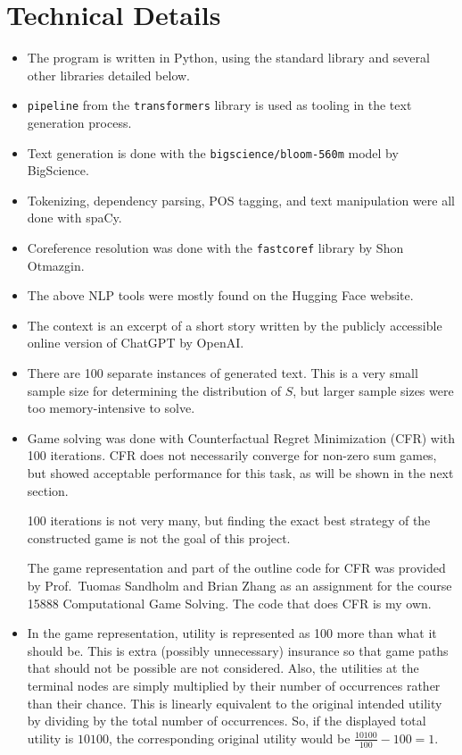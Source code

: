 \documentclass[11pt]{article}
\begin{document}
    \section{Technical Details}\label{sec:technical-details}

    \begin{itemize}
        \item
        The program is written in Python, using the standard library and several other libraries detailed below.
        \item
        \texttt{pipeline} from the \texttt{transformers} library is used as tooling in the text generation process.
        \item
        Text generation is done with the \texttt{bigscience/bloom-560m} model by BigScience.
        \item
        Tokenizing, dependency parsing, POS tagging, and text manipulation were all done with spaCy.
        \item
        Coreference resolution was done with the \texttt{fastcoref} library by Shon Otmazgin.
        \item
        The above NLP tools were mostly found on the Hugging Face website.
        \item
        The context is an excerpt of a short story written by the publicly accessible online version of ChatGPT
        by OpenAI\@.
        \item
        There are 100 separate instances of generated text.
        This is a very small sample size for determining the distribution of $S$,
        but larger sample sizes were too memory-intensive to solve.
        \item
        Game solving was done with Counterfactual Regret Minimization (CFR) with 100 iterations.
        CFR does not necessarily converge for non-zero sum games,
        but showed acceptable performance for this task, as will be shown in the next section.

        100 iterations is not very many,
        but finding the exact best strategy of the constructed game is not the goal of this project.

        The game representation and part of the outline code for CFR was provided by Prof.\ Tuomas Sandholm
        and Brian Zhang as an assignment for the course 15888 Computational Game Solving.
        The code that does CFR is my own.
        \item
        In the game representation, utility is represented as 100 more than what it should be.
        This is extra (possibly unnecessary) insurance so that game paths that should not be possible
        are not considered.
        Also, the utilities at the terminal nodes are simply multiplied by their number of occurrences
        rather than their chance.
        This is linearly equivalent to the original intended utility by dividing by the total number of occurrences.
        So, if the displayed total utility is $10100$, the corresponding original utility would be
        $\frac{10100}{100} - 100 = 1$.
    \end{itemize}
\end{document}
